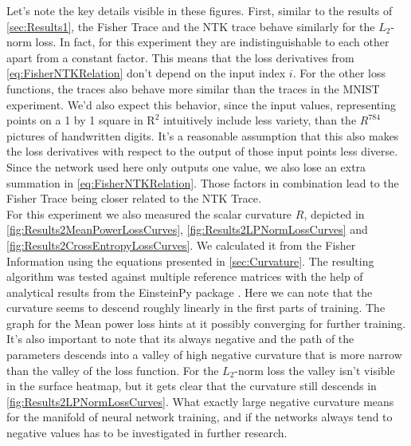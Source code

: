 Let's note the key details visible in these figures. First, similar to the results of \cref{sec:Results1}, the Fisher Trace and the NTK trace behave similarly for the $L_2$-norm loss. In fact, for this experiment they are indistinguishable to each other apart from a constant factor. This means that the loss derivatives from \cref{eq:FisherNTKRelation} don't depend on the input index $i$. For the other loss functions, the traces also behave more similar than the traces in the MNIST experiment. We'd also expect this behavior, since the input values, representing points on a 1 by 1 square in $\mathrm{R}^2$ intuitively include less variety, than the $R^{784}$ pictures of handwritten digits. It's a reasonable assumption that this also makes the loss derivatives with respect to the output of those input points less diverse. Since the network used here only outputs one value, we also lose an extra summation in \cref{eq:FisherNTKRelation}. Those factors in combination lead to the Fisher Trace being closer related to the NTK Trace.\\
For this experiment we also measured the scalar curvature $R$, depicted in \cref{fig:Results2MeanPowerLossCurves}, \cref{fig:Results2LPNormLossCurves} and \cref{fig:Results2CrossEntropyLossCurves}. We calculated it from the Fisher Information using the equations presented in \cref{sec:Curvature}. The resulting algorithm was tested against multiple reference matrices with the help of analytical results from the EinsteinPy package \cite{EinsteinPyPackage}. Here we can note that the curvature seems to descend roughly linearly in the first parts of training. The graph for the Mean power loss hints at it possibly converging for further training. It's also important to note that its always negative and the path of the parameters descends into a valley of high negative curvature that is more narrow than the valley of the loss function. For the $L_2$-norm loss the valley isn't visible in the surface heatmap, but it gets clear that the curvature still descends in \cref{fig:Results2LPNormLossCurves}. What exactly large negative curvature means for the manifold of neural network training, and if the networks always tend to negative values has to be investigated in further research.